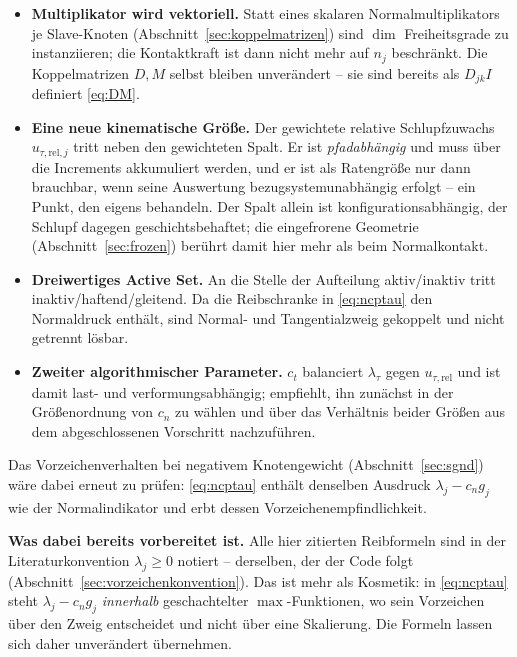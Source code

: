 \documentclass[a4paper,11pt]{article}
\def\bm#1{#1}%
\def\tilde#1{#1}%
\begin{document}
\begin{itemize}\itemsep2pt
  \item \textbf{Multiplikator wird vektoriell.} Statt eines skalaren Normalmultiplikators je
        Slave-Knoten (Abschnitt~\ref{sec:koppelmatrizen}) sind $\dim$ Freiheitsgrade zu
        instanziieren; die Kontaktkraft ist dann nicht mehr auf $\bm n_j$ beschränkt. Die
        Koppelmatrizen $\bm D,\bm M$ selbst bleiben unverändert -- sie sind bereits als
        $D_{jk}\bm I$ definiert \eqref{eq:DM}.
  \item \textbf{Eine neue kinematische Größe.} Der gewichtete relative Schlupfzuwachs
        $\tilde{\bm u}_{\tau,\text{rel},j}$ tritt neben den gewichteten Spalt. Er ist
        \emph{pfadabhängig} und muss über die Increments akkumuliert werden, und er ist als
        Ratengröße nur dann brauchbar, wenn seine Auswertung bezugsystemunabhängig erfolgt
        -- ein Punkt, den \citet{gitterle} eigens behandeln. Der Spalt allein ist
        konfigurationsabhängig, der Schlupf dagegen geschichtsbehaftet; die eingefrorene
        Geometrie (Abschnitt~\ref{sec:frozen}) berührt damit hier mehr als beim Normalkontakt.
  \item \textbf{Dreiwertiges Active Set.} An die Stelle der Aufteilung aktiv/inaktiv tritt
        inaktiv/haftend/gleitend. Da die Reibschranke in \eqref{eq:ncptau} den Normaldruck
        enthält, sind Normal- und Tangentialzweig gekoppelt und nicht getrennt lösbar.
  \item \textbf{Zweiter algorithmischer Parameter.} $c_t$ balanciert $\bm\lambda_\tau$ gegen
        $\tilde{\bm u}_{\tau,\text{rel}}$ und ist damit last- und verformungsabhängig;
        \citet[Abschn.~3.5.2]{farah} empfiehlt, ihn zunächst in der Größenordnung von $c_n$ zu
        wählen und über das Verhältnis beider Größen aus dem abgeschlossenen Vorschritt
        nachzuführen.
\end{itemize}

\noindent Das Vorzeichenverhalten bei negativem Knotengewicht (Abschnitt~\ref{sec:sgnd}) wäre
dabei erneut zu prüfen: \eqref{eq:ncptau} enthält denselben Ausdruck
$\lambda_j-c_n\tilde g_j$ wie der Normalindikator und erbt dessen Vorzeichenempfindlichkeit.

\medskip
\noindent\textbf{Was dabei bereits vorbereitet ist.} Alle hier zitierten Reibformeln sind in der
Literaturkonvention $\lambda_{j}\ge0$ notiert -- derselben, der der Code folgt
(Abschnitt~\ref{sec:vorzeichenkonvention}). Das ist mehr als Kosmetik: in \eqref{eq:ncptau} steht
$\lambda_{j}-c_n\tilde g_j$ \emph{innerhalb} geschachtelter $\max$-Funktionen, wo sein Vorzeichen
über den Zweig entscheidet und nicht über eine Skalierung. Die Formeln lassen sich daher
unverändert übernehmen.
\end{document}
